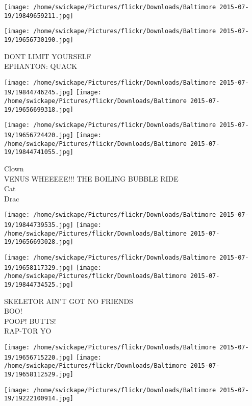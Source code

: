 \documentclass[10pt,letterpaper]{article}
\begin{document}
\texttt{[image: /home/swickape/Pictures/flickr/Downloads/Baltimore 2015-07-19/19849659211.jpg]}

\vspace{0.25in}
\texttt{[image: /home/swickape/Pictures/flickr/Downloads/Baltimore 2015-07-19/19656730190.jpg]}

DONT LIMIT YOURSELF\\
EPHANTON: QUACK\\
\pagebreak

\texttt{[image: /home/swickape/Pictures/flickr/Downloads/Baltimore 2015-07-19/19844746245.jpg]}
\texttt{[image: /home/swickape/Pictures/flickr/Downloads/Baltimore 2015-07-19/19656699318.jpg]}

\texttt{[image: /home/swickape/Pictures/flickr/Downloads/Baltimore 2015-07-19/19656724420.jpg]}
\texttt{[image: /home/swickape/Pictures/flickr/Downloads/Baltimore 2015-07-19/19844741055.jpg]}

Clown\\
VENUS WHEEEEE!!! THE BOILING BUBBLE RIDE\\
Cat\\
Drac\\
\pagebreak

\texttt{[image: /home/swickape/Pictures/flickr/Downloads/Baltimore 2015-07-19/19844739535.jpg]}
\texttt{[image: /home/swickape/Pictures/flickr/Downloads/Baltimore 2015-07-19/19656693028.jpg]}

\texttt{[image: /home/swickape/Pictures/flickr/Downloads/Baltimore 2015-07-19/19658117329.jpg]}
\texttt{[image: /home/swickape/Pictures/flickr/Downloads/Baltimore 2015-07-19/19844734525.jpg]}

SKELETOR AIN'T GOT NO FRIENDS\\
BOO!\\
POOP!  BUTTS!\\
RAP{-}TOR YO\\
\pagebreak

\texttt{[image: /home/swickape/Pictures/flickr/Downloads/Baltimore 2015-07-19/19656715220.jpg]}
\texttt{[image: /home/swickape/Pictures/flickr/Downloads/Baltimore 2015-07-19/19658112529.jpg]}

\vspace{0.25in}
\texttt{[image: /home/swickape/Pictures/flickr/Downloads/Baltimore 2015-07-19/19222100914.jpg]}
\end{document}
